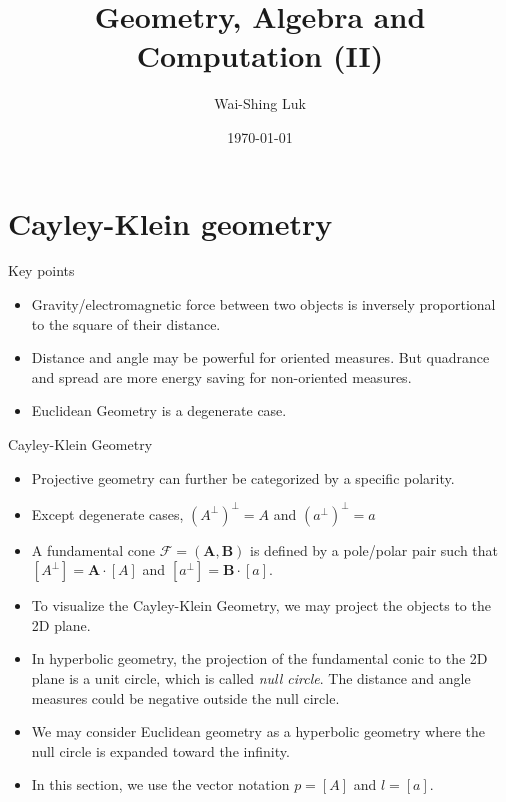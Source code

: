 \documentclass[10pt,ignorenonframetext,serif,onlymath]{beamer}
\title{Geometry, Algebra and Computation (II)}
\author{Wai-Shing Luk}
\institute{Fudan University}
\date{\today}
\begin{document}
\frame{\titlepage}

\begin{frame}
\tableofcontents[hideallsubsections]
\end{frame}
\hypertarget{sec:cayley-klein-geometry}{%
\section{Cayley-Klein geometry}\label{sec:cayley-klein-geometry}}

\begin{frame}{Key points}
\protect\hypertarget{sec:key-points}{}

\begin{itemize}
\item
  Gravity/electromagnetic force between two objects is inversely
  proportional to the square of their distance.
\item
  Distance and angle may be powerful for oriented measures. But
  quadrance and spread are more energy saving for non-oriented measures.
\item
  Euclidean Geometry is a degenerate case.
\end{itemize}

\end{frame}

\begin{frame}{Cayley-Klein Geometry}
\protect\hypertarget{sec:cayley-klein-geometry-1}{}

\begin{itemize}
\item
  Projective geometry can further be categorized by a specific polarity.
\item
  Except degenerate cases, \((A^\perp)^\perp = A\) and
  \((a^\perp)^\perp = a\)
\item
  A fundamental cone \(\mathcal{F} = (\mathbf{A}, \mathbf{B})\) is
  defined by a pole/polar pair such that
  \([A^\perp] = \mathbf{A} \cdot [A]\) and
  \([a^\perp] = \mathbf{B} \cdot [a]\).
\item
  To visualize the Cayley-Klein Geometry, we may project the objects to
  the 2D plane.
\item
  In hyperbolic geometry, the projection of the fundamental conic to the
  2D plane is a unit circle, which is called \emph{null circle}. The
  distance and angle measures could be negative outside the null circle.
\item
  We may consider Euclidean geometry as a hyperbolic geometry where the
  null circle is expanded toward the infinity.
\item
  In this section, we use the vector notation \(p = [A]\) and
  \(l = [a]\).
\end{itemize}

\end{frame}
\end{document}
